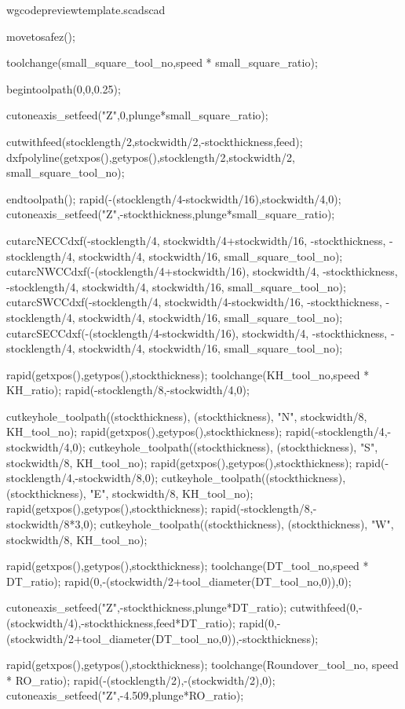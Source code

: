 \documentclass{ltxdoc}
\begin{document}
\begin{writecode}{w}{gcodepreviewtemplate.scad}{scad}
{movetosafez();

toolchange(small_square_tool_no,speed * small_square_ratio);

begintoolpath(0,0,0.25);

cutoneaxis_setfeed("Z",0,plunge*small_square_ratio);

cutwithfeed(stocklength/2,stockwidth/2,-stockthickness,feed);
dxfpolyline(getxpos(),getypos(),stocklength/2,stockwidth/2, small_square_tool_no);

endtoolpath();
rapid(-(stocklength/4-stockwidth/16),stockwidth/4,0);
cutoneaxis_setfeed("Z",-stockthickness,plunge*small_square_ratio);

cutarcNECCdxf(-stocklength/4, stockwidth/4+stockwidth/16, -stockthickness, -stocklength/4, stockwidth/4, stockwidth/16, small_square_tool_no);
cutarcNWCCdxf(-(stocklength/4+stockwidth/16), stockwidth/4, -stockthickness, -stocklength/4, stockwidth/4, stockwidth/16, small_square_tool_no);
cutarcSWCCdxf(-stocklength/4, stockwidth/4-stockwidth/16, -stockthickness, -stocklength/4, stockwidth/4, stockwidth/16, small_square_tool_no);
cutarcSECCdxf(-(stocklength/4-stockwidth/16), stockwidth/4, -stockthickness, -stocklength/4, stockwidth/4, stockwidth/16, small_square_tool_no);

rapid(getxpos(),getypos(),stockthickness);
toolchange(KH_tool_no,speed * KH_ratio);
rapid(-stocklength/8,-stockwidth/4,0);

cutkeyhole_toolpath((stockthickness), (stockthickness), "N", stockwidth/8, KH_tool_no);
rapid(getxpos(),getypos(),stockthickness);
rapid(-stocklength/4,-stockwidth/4,0);
cutkeyhole_toolpath((stockthickness), (stockthickness), "S", stockwidth/8, KH_tool_no);
rapid(getxpos(),getypos(),stockthickness);
rapid(-stocklength/4,-stockwidth/8,0);
cutkeyhole_toolpath((stockthickness), (stockthickness), "E", stockwidth/8, KH_tool_no);
rapid(getxpos(),getypos(),stockthickness);
rapid(-stocklength/8,-stockwidth/8*3,0);
cutkeyhole_toolpath((stockthickness), (stockthickness), "W", stockwidth/8, KH_tool_no);

rapid(getxpos(),getypos(),stockthickness);
toolchange(DT_tool_no,speed * DT_ratio);
rapid(0,-(stockwidth/2+tool_diameter(DT_tool_no,0)),0);

cutoneaxis_setfeed("Z",-stockthickness,plunge*DT_ratio);
cutwithfeed(0,-(stockwidth/4),-stockthickness,feed*DT_ratio);
rapid(0,-(stockwidth/2+tool_diameter(DT_tool_no,0)),-stockthickness);

rapid(getxpos(),getypos(),stockthickness);
toolchange(Roundover_tool_no, speed * RO_ratio);
rapid(-(stocklength/2),-(stockwidth/2),0);
cutoneaxis_setfeed("Z",-4.509,plunge*RO_ratio);

}
\end{writecode}
\end{document}
